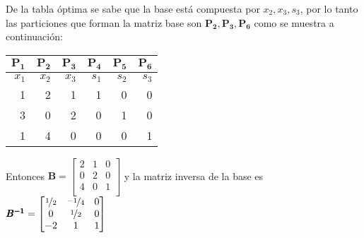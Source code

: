 \documentclass[../main.tex]{subfiles}
\begin{document}
\begin{questions}
\begin{solution}{}
{  \par}

De la tabla óptima se sabe que la base está compuesta por $x_2, x_3, s_3$, por lo tanto las particiones que forman la  matriz base son $\pmb{P_2}, \pmb{P_3}, \pmb{P_6}$ como se muestra a continuación:

{\centering
    \begin{tabular}{rrrrrr}
      \toprule
      $\pmb{P_1}$	&\cellcolor{blue!30}$\pmb{P_2}$&	\cellcolor{blue!30}$\pmb{P_3}$&	$\pmb{P_4}$&	$\pmb{P_5}$&	\cellcolor{blue!30}$\pmb{P_6}$\\
      \midrule
      $x_1$	&\cellcolor{blue!30}$x_2$&	\cellcolor{blue!30}$x_3$&	$s_1$&	$s_2$&	\cellcolor{blue!30}$s_3$\\
      \midrule
      1&	\cellcolor{blue!30}2&	\cellcolor{blue!30}1&	1&	0&	\cellcolor{blue!30}0\\
      3&	\cellcolor{blue!30}0&	\cellcolor{blue!30}2&	0&	1&	\cellcolor{blue!30}0\\
      1&	\cellcolor{blue!30}4&	\cellcolor{blue!30}0&	0&	0&	\cellcolor{blue!30}1\\
      \bottomrule
    \end{tabular}

  \par}

Entonces $\pmb{B} =
\begin{bmatrix}
  2& 1& 0\\
  0& 2& 0\\
  4& 0& 1\\
\end{bmatrix}
$
 y la matriz inversa de la base es $\pmb{B^{-1}} =
 \begin{bmatrix}
   \nicefrac{1}{2} & \nicefrac{-1}{4} & 0\\
   0 & \nicefrac{1}{2} & 0\\
   -2 & 1 & 1\\
\end{bmatrix}
$


\end{solution}
\end{questions}
\end{document}
